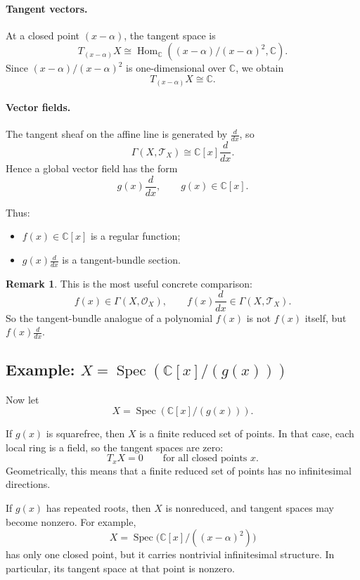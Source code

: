 \documentclass[11pt]{article}
\theoremstyle{definition}
\newtheorem{remark}[theorem]{Remark}
\newcommand{\C}{\mathbb{C}}
\newcommand{\Spec}{\operatorname{Spec}}
\begin{document}
	\paragraph{Tangent vectors.}
	At a closed point \((x-\alpha)\), the tangent space is
	\[
	T_{(x-\alpha)}X
	\cong
	\operatorname{Hom}_\C\!\left((x-\alpha)/(x-\alpha)^2,\C\right).
	\]
	Since \((x-\alpha)/(x-\alpha)^2\) is one-dimensional over \(\C\), we obtain
	\[
	T_{(x-\alpha)}X\cong \C.
	\]
	
	\paragraph{Vector fields.}
	The tangent sheaf on the affine line is generated by \(\frac{d}{dx}\), so
	\[
	\Gamma(X,\mathcal T_X)\cong \C[x]\frac{d}{dx}.
	\]
	Hence a global vector field has the form
	\[
	g(x)\frac{d}{dx},
	\qquad g(x)\in \C[x].
	\]
	
	Thus:
	
	\begin{itemize}
		\item \(f(x)\in \C[x]\) is a regular function;
		\item \(g(x)\frac{d}{dx}\) is a tangent-bundle section.
	\end{itemize}
	
	\begin{remark}
		This is the most useful concrete comparison:
		\[
		\boxed{
			f(x)\in \Gamma(X,\mathcal O_X),
			\qquad
			f(x)\frac{d}{dx}\in \Gamma(X,\mathcal T_X).
		}
		\]
		So the tangent-bundle analogue of a polynomial \(f(x)\) is not \(f(x)\) itself, but \(f(x)\frac{d}{dx}\).
	\end{remark}
	
	\subsection{Example: \texorpdfstring{$X=\Spec(\C[x]/(g(x)))$}{X=Spec(C[x]/(g(x)))}}
	
	Now let
	\[
	X=\Spec(\C[x]/(g(x))).
	\]
	
	If \(g(x)\) is squarefree, then \(X\) is a finite reduced set of points. In that case, each local ring is a field, so the tangent spaces are zero:
	\[
	T_xX=0
	\qquad
	\text{for all closed points }x.
	\]
	Geometrically, this means that a finite reduced set of points has no infinitesimal directions.
	
	If \(g(x)\) has repeated roots, then \(X\) is nonreduced, and tangent spaces may become nonzero. For example,
	\[
	X=\Spec\!\bigl(\C[x]/((x-\alpha)^2)\bigr)
	\]
	has only one closed point, but it carries nontrivial infinitesimal structure. In particular, its tangent space at that point is nonzero.
	
\end{document}
